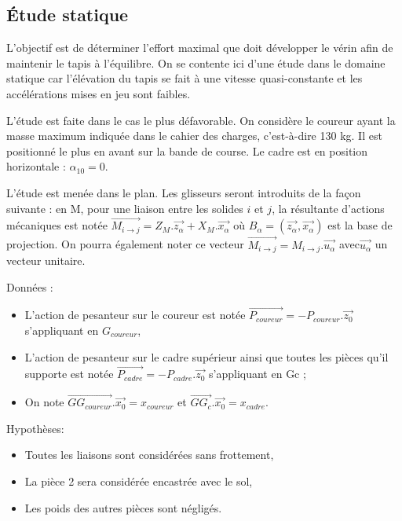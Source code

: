\subsection{Étude statique}

L'objectif est de déterminer l'effort maximal que doit développer le vérin afin de maintenir le tapis à l'équilibre. On se contente ici d'une étude dans le domaine statique car l'élévation du tapis se fait à une vitesse quasi-constante et les accélérations mises en jeu sont faibles.

L'étude est faite dans le cas le plus défavorable. On considère le coureur ayant la masse maximum indiquée dans le cahier des charges, c'est-à-dire 130 kg. Il est positionné le plus en avant sur la bande de course. Le cadre est en position horizontale : $\alpha_{10}=0$\textdegree.

L'étude est menée dans le plan. Les glisseurs seront introduits de la façon suivante : en M, pour une liaison entre les solides $i$ et $j$, la résultante d'actions mécaniques est notée $\overrightarrow{M_{i \rightarrow j}}=Z_M.\overrightarrow{z_\alpha}+X_M.\overrightarrow{x_\alpha}$ où $B_\alpha=\left(\overrightarrow{z_\alpha},\overrightarrow{x_\alpha}\right)$ est la base de projection. On pourra également noter ce vecteur $\overrightarrow{M_{i \rightarrow j}}=M_{i \rightarrow j}.\overrightarrow{u_\alpha}$ avec$ \overrightarrow{u_\alpha}$ un vecteur unitaire.

Données :
\begin{itemize}
 \item L'action de pesanteur sur le coureur est notée $\overrightarrow{P_{coureur}}=-P_{coureur}.\overrightarrow{z_0}$ s'appliquant en $G_{coureur}$,
 \item L'action de pesanteur sur le cadre supérieur ainsi que toutes les pièces qu'il supporte est notée $\overrightarrow{P_{cadre}}=-P_{cadre}.\overrightarrow{z_0}$ s'appliquant en Gc ;
 \item On note $\overrightarrow{GG_{coureur}}.\overrightarrow{x_0}=x_{coureur}$ et $\overrightarrow{GG_c}.\overrightarrow{x_0}=x_{cadre}$.
\end{itemize}

Hypothèses:
\begin{itemize}
 \item Toutes les liaisons sont considérées sans frottement,
 \item La pièce 2 sera considérée encastrée avec le sol,
 \item Les poids des autres pièces sont négligés.
\end{itemize}

